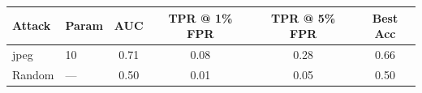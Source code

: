 \begin{tabular}{llcccc}
\toprule
Attack & Param & AUC & TPR @ 1\% FPR & TPR @ 5\% FPR & Best Acc \\
\midrule
jpeg & 10 & 0.71 & 0.08 & 0.28 & 0.66 \\
Random & — & 0.50 & 0.01 & 0.05 & 0.50 \\
\bottomrule
\end{tabular}
